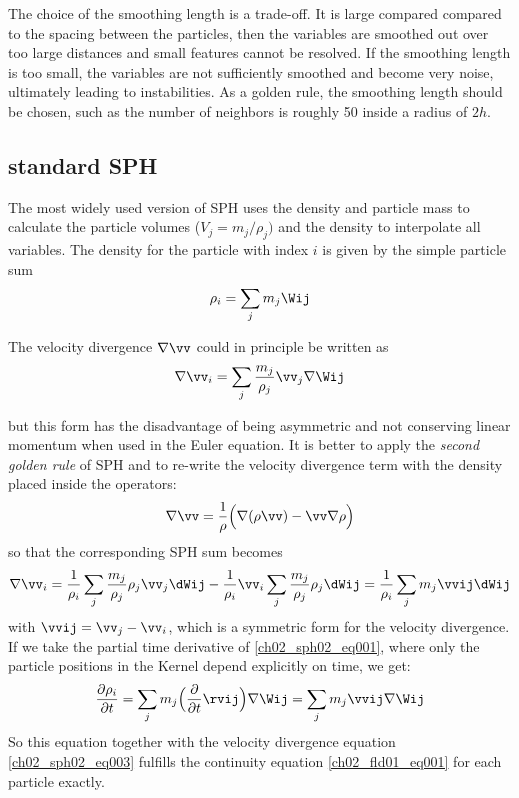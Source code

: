 The choice of the smoothing length is a trade-off. It is large compared compared to the spacing between the particles, then the variables are smoothed out over too large distances and small features cannot be resolved. If the smoothing length is too small, the variables are not sufficiently smoothed and become very noise, ultimately leading to instabilities. As a golden rule, the smoothing length should be chosen, such as the number of neighbors is roughly 50 inside a radius of $2h$.

\subsection{standard SPH}
The most widely used version of SPH uses the density and particle mass to calculate the particle volumes ($V_j = m_j / \rho_j)$ and the density to interpolate all variables. The density for the particle with index $i$ is given by the simple particle sum
\begin{equation}
\label{ch02_sph02_eq001}
\rho_i = \sum_{j} m_j \Wij
\end{equation}

The velocity divergence $\nabla \vv$ could in principle be written as
\begin{equation}
\label{ch02_sph02_eq002}
\nabla \vv_i = \sum_{j} \frac{m_j}{\rho_j} \vv_j \nabla \Wij
\end{equation}

but this form has the disadvantage of being asymmetric and not conserving linear momentum when used in the Euler equation. It is better to apply the \emph{second golden rule} of SPH \citep{Monaghan:1992p3721} and to re-write the velocity divergence term with the density placed inside the operators:
\begin{equation}
\label{ch02_sph02_eq003}
\nabla \vv = \frac{1}{\rho} \Big( \nabla (\rho \vv) - \vv \nabla \rho \Big)
\end{equation}
so that the corresponding SPH sum becomes 
\begin{equation}
\label{ch02_sph02_eq003}
\nabla \vv_i = \frac{1}{\rho_i} \sum_{j} \frac{m_j}{\rho_j} \rho_j \vv_j \dWij - \frac{1}{\rho_i} \vv_i \sum_{j} \frac{m_j}{\rho_j} \rho_j \dWij = \frac{1}{\rho_i} \sum_{j} m_j \vvij \dWij 
\end{equation}
with $\vvij = \vv_j - \vv_i$, which is a symmetric form for the velocity divergence. If we take the partial time derivative of \ref{ch02_sph02_eq001}, where only the particle positions in the Kernel depend explicitly on time, we get: 
\begin{equation}
\label{ch02_sph02_eq004}
\frac{\partial \rho_i}{\partial t}  = \sum_{j} m_j \Big( \frac{\partial}{\partial t} \rvij \Big) \nabla \Wij = \sum_{j} m_j \vvij \nabla \Wij 
\end{equation}
So this equation together with the velocity divergence equation \ref{ch02_sph02_eq003} fulfills the continuity equation \ref{ch02_fld01_eq001} for each particle exactly.

